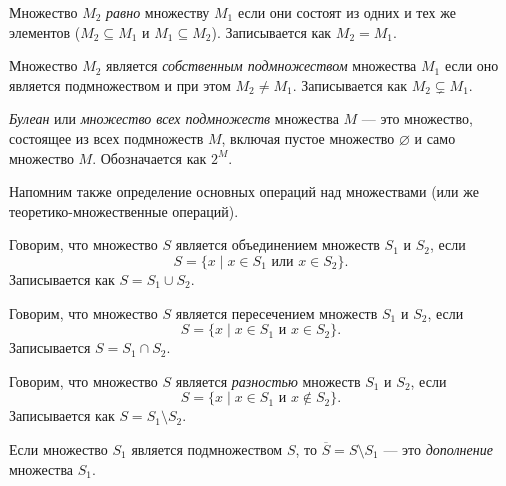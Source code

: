 \begin{definition}
    Множество $M_2$ \emph{равно} множеству $M_1$ если они состоят из одних и тех же элементов ($M_2 \subseteq M_1$ и $M_1 \subseteq M_2$).
    Записывается как $M_2 = M_1$.
\end{definition}

\begin{definition}
    Множество $M_2$ является \emph{собственным подмножеством} множества $M_1$ если оно является подмножеством и при этом $M_2 \neq M_1$.
    Записывается как $M_2 \varsubsetneq M_1$.
\end{definition}

\begin{definition}[Булеан]
    \emph{Булеан} или \emph{множество всех подмножеств} множества $M$ --- это множество, состоящее из всех подмножеств $M$, включая пустое множество $\varnothing$ и само множество $M$.
    Обозначается как $2^M$.
\end{definition}

Напомним также определение основных операций над множествами (или же теоретико-множественные операций).

\begin{definition}
    Говорим, что множество $S$ является объединением множеств $S_1$ и $S_2$, если
    \[S = \{ x \mid x \in S_1 \text{ или } x \in S_2\}.\]
    Записывается как $S = S_1 \cup S_2$.
\end{definition}

\begin{definition}
    Говорим, что множество $S$ является пересечением множеств $S_1$ и $S_2$, если
    \[S = \{ x \mid x \in S_1 \text{ и } x \in S_2\}.\]
    Записывается $S = S_1 \cap S_2$.
\end{definition}

\begin{definition}
    Говорим, что множество $S$ является \emph{разностью} множеств $S_1$ и $S_2$, если
    \[S = \{ x \mid x \in S_1 \text{ и } x \notin S_2\}.\]
    Записывается как $S = S_1 \setminus S_2$.
\end{definition}

\begin{definition}
    Если множество $S_1$ является подмножеством $S$, то $\overline{S} = S \setminus S_1$ --- это \emph{дополнение} множества $S_1$.
\end{definition}

